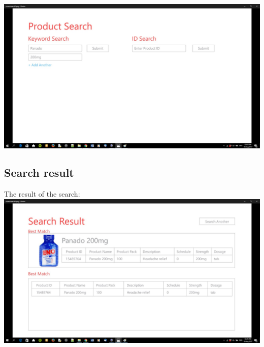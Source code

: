 \documentclass[a4paper,10pt]{article}
\begin{document}
	{\centering\includegraphics[width=15cm, scale=0.5]{smarctsearch5.jpg}} \\
	\subsection{Search result}
	The result of the search: \\
	{\centering\includegraphics[width=15cm, scale=0.5]{smarctsearch6.jpg}} \\
\end{document}
